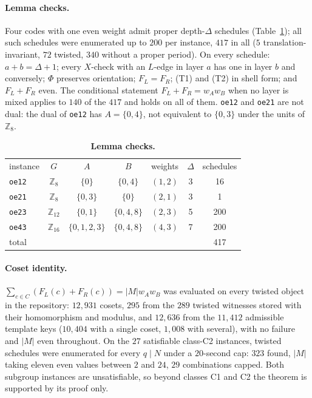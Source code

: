 \documentclass[reprint,twocolumn,superscriptaddress,nofootinbib]{revtex4-2}
\theoremstyle{plain}
\newcommand{\wA}{w_A}                  %
\newcommand{\wB}{w_B}
\begin{document}
\paragraph*{Lemma checks.}
Four codes with one even weight admit proper depth-$\Delta$ schedules
(Table~\ref{tab:lemmas}); all such schedules were enumerated up to $200$
per instance, $417$ in all ($5$ translation-invariant, $72$ twisted, $340$
without a proper period). On every schedule: $a+b=\Delta+1$; every
$X$-check with an $L$-edge in layer $a$ has one in layer $b$ and
conversely; $\Phi$ preserves orientation; $F_L=F_R$; (T1) and (T2) in
shell form; and $F_L+F_R$ even. The conditional statement
$F_L+F_R=\wA\wB$ when no layer is mixed applies to $140$ of the $417$ and
holds on all of them. \texttt{oe12} and \texttt{oe21} are not dual: the
dual of \texttt{oe12} has $A=\{0,4\}$, not equivalent to $\{0,3\}$ under
the units of $\mathbb{Z}_8$.

\begin{table}[!htbp]
\caption{\textbf{Lemma checks.}}
\label{tab:lemmas}
\begin{ruledtabular}
\begin{tabular}{lcccccc}
instance & $G$ & $A$ & $B$ & weights & $\Delta$ & schedules \\
\colrule
\texttt{oe12} & $\mathbb{Z}_8$    & $\{0\}$       & $\{0,4\}$   & $(1,2)$ & 3 & 16  \\
\texttt{oe21} & $\mathbb{Z}_8$    & $\{0,3\}$     & $\{0\}$     & $(2,1)$ & 3 & 1   \\
\texttt{oe23} & $\mathbb{Z}_{12}$ & $\{0,1\}$     & $\{0,4,8\}$ & $(2,3)$ & 5 & 200 \\
\texttt{oe43} & $\mathbb{Z}_{16}$ & $\{0,1,2,3\}$ & $\{0,4,8\}$ & $(4,3)$ & 7 & 200 \\
\colrule
total & & & & & & 417 \\
\end{tabular}
\end{ruledtabular}
\end{table}

\paragraph*{Coset identity.}
$\sum_{c\in C}(F_L(c)+F_R(c))=|M|\wA\wB$ was evaluated on every twisted
object in the repository: $12{,}931$ cosets, $295$ from the $289$ twisted
witnesses stored with their homomorphism and modulus, and $12{,}636$ from
the $11{,}412$ admissible template keys ($10{,}404$ with a single coset,
$1{,}008$ with several), with no failure and $|M|$ even throughout. On the
$27$ satisfiable class-C2 instances, twisted schedules were enumerated for
every $q\mid N$ under a $20$-second cap: $323$ found, $|M|$ taking eleven
even values between $2$ and $24$, $29$ combinations capped. Both subgroup
instances are unsatisfiable, so beyond classes C1 and C2 the theorem is
supported by its proof only.
\end{document}
